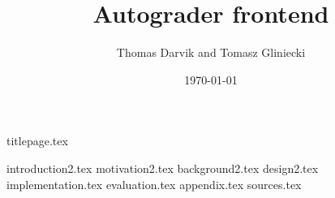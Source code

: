 \documentclass[12pt]{report}
\title{Autograder frontend}
\author{Thomas Darvik and Tomasz Gliniecki}
\date{\today}
\begin{document}
{titlepage.tex}

\tableofcontents
{}

{introduction2.tex}
{motivation2.tex}
{background2.tex}
{design2.tex}
{implementation.tex}
{evaluation.tex}
{appendix.tex}
{sources.tex}
\end{document}
